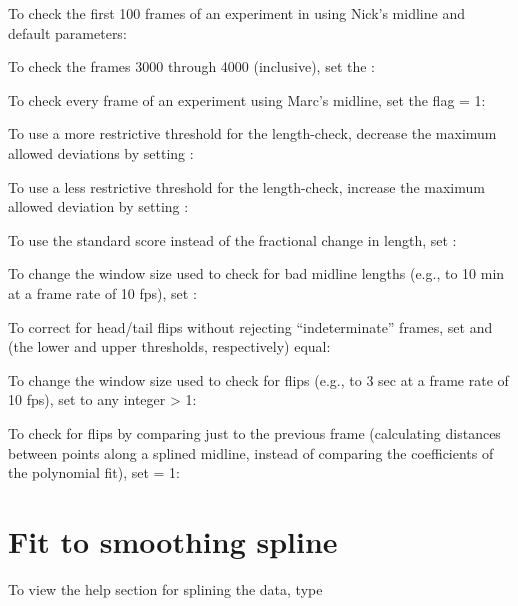 \documentclass[letterpaper,10pt,openany,oneside]{sphinxmanual}
\begin{document}
To check the first 100 frames of an experiment in 
using Nick's midline and default parameters:


To check the frames 3000 through 4000 (inclusive), set the :


To check every frame of an experiment using Marc's midline, set the  flag = 1:


To use a more restrictive threshold for the length-check, decrease the maximum allowed deviations by setting :


To use a less restrictive threshold for the length-check, increase the maximum allowed deviation by setting :


To use the standard score instead of the fractional change in length, set :


To change the window size used to check for bad midline lengths (e.g., to 10 min at a frame rate of 10 fps), set :


To correct for head/tail flips without rejecting ``indeterminate'' frames, set  and  (the lower and upper thresholds, respectively) equal:


To change the window size used to check for flips (e.g., to 3 sec at a frame rate of 10 fps), set  to any integer \textgreater{} 1:


To check for flips by comparing just to the previous frame (calculating distances between points along a splined midline, instead of comparing the coefficients of the polynomial fit), set  = 1:



\chapter{Fit to smoothing spline}
\label{index:fit-to-smoothing-spline}
To view the help section for splining the data, type
\end{document}
